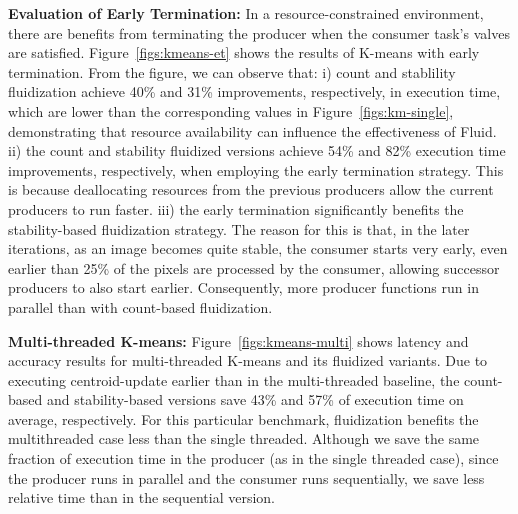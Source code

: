 \textbf{Evaluation of Early Termination:}
In a resource-constrained environment, there are benefits from terminating the producer when the consumer task's valves are satisfied. Figure~\ref{figs:kmeans-et} shows the results of K-means with early termination. From the figure, we can observe that: i) count and stablility fluidization achieve 40\% and 31\% improvements, respectively, in execution time, which are lower than the corresponding values in Figure~\ref{figs:km-single}, demonstrating that resource availability can influence the effectiveness of Fluid. ii) the count and stability fluidized versions achieve 54\% and 82\% execution time improvements, respectively, when employing the early termination strategy. This is because deallocating resources from the previous producers allow the current producers to run faster. iii) the early termination significantly benefits the stability-based fluidization strategy. The reason for this is that, in the later iterations, as an image becomes quite stable, the consumer starts very early, even earlier than 25\% of the pixels are processed by the consumer, allowing  successor producers to also start earlier. Consequently, more producer functions run in parallel than with count-based fluidization. 

\textbf{Multi-threaded K-means:} Figure~\ref{figs:kmeans-multi} shows latency and accuracy results for multi-threaded K-means and its fluidized variants. Due to executing centroid-update earlier than in the multi-threaded baseline, the count-based and stability-based versions save 43\% and 57\% of execution time on average, respectively. For this particular benchmark, fluidization benefits the multithreaded case less than the single threaded.  Although we save the same fraction of execution time in the producer (as in the single threaded case), since the producer runs in parallel and the consumer runs sequentially, we save less relative time than in the sequential version.


